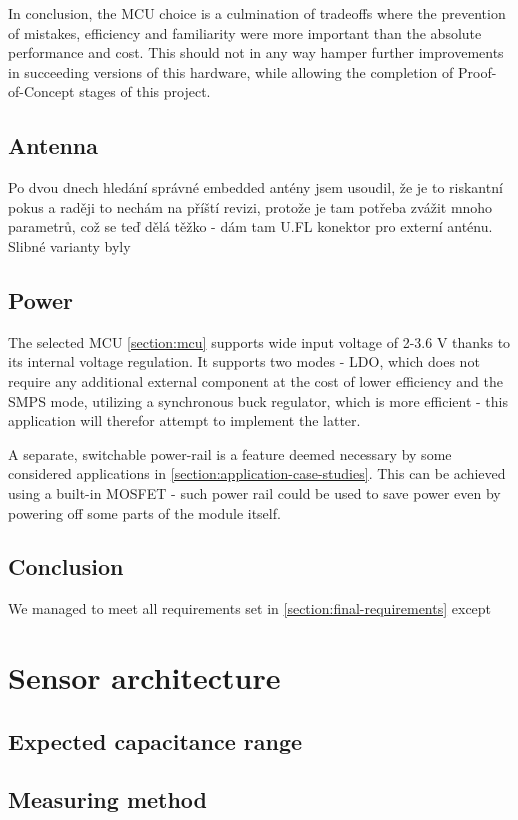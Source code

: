 In conclusion, the MCU choice is a culmination of tradeoffs where the prevention of mistakes, efficiency and familiarity were more important than the absolute performance and cost. This should not in any way hamper further improvements in succeeding versions of this hardware, while allowing the completion of Proof-of-Concept stages of this project. 

\subsection{Antenna}
Po dvou dnech hledání správné embedded antény jsem usoudil, že je to riskantní pokus a raději to nechám na příští revizi, protože je tam potřeba zvážit mnoho parametrů, což se teď dělá těžko - dám tam U.FL konektor pro externí anténu. Slibné varianty byly

\subsection{Power}
The selected MCU \ref{section:mcu} supports wide input voltage of 2-3.6 V thanks to its internal voltage regulation. It supports two modes - LDO, which does not require any additional external component at the cost of lower efficiency and the SMPS mode, utilizing a synchronous buck regulator, which is more efficient - this application will therefor attempt to implement the latter.

A separate, switchable power-rail is a feature deemed necessary by some considered applications in \ref{section:application-case-studies}. This can be achieved using a built-in MOSFET - such power rail could be used to save power even by powering off some parts of the module itself.

\subsection{Conclusion}
We managed to meet all requirements set in \ref{section:final-requirements} except


\section{Sensor architecture}

\subsection{Expected capacitance range}

\subsection{Measuring method}
